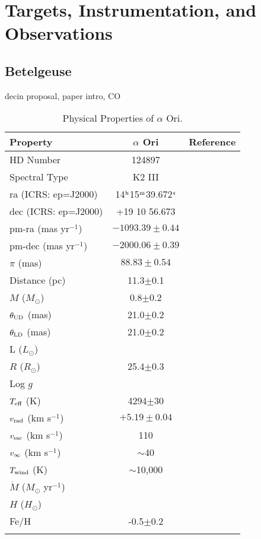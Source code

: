 
\chapter{Targets, Instrumentation, and Observations} \label{chap:3}

\section{Betelgeuse}\label{sec:3.1}
decin proposal, paper intro, CO

\begin{table}
\begin{center}
\caption[Physical Properties of $\alpha$ Ori.]
{Physical Properties of $\alpha$ Ori.}
\begin{tabular}{lcc}
\hline
\hline
\rule{0pt}{2.5ex}Property & $\alpha$ Ori & Reference \\
\hline
\rule{0pt}{2.5ex}HD Number & 124897 & \\
Spectral Type & K2 III &\\ 
ra (ICRS: ep=J2000)&14$^{\rm{h}}$15$^{\rm{m}}$39.672$^{\rm{s}}$&\\
dec (ICRS: ep=J2000) & +19 10 56.673 & \\
pm-ra (mas yr$^{-1}$)& $-1093.39 \pm 0.44$ & \\
pm-dec (mas yr$^{-1}$)& $-2000.06 \pm 0.39$ & \\
$\pi$ (mas)& $88.83\pm 0.54$ &\\
Distance (pc)& 11.3$\pm$0.1 & \\
$M$ ($M_{\odot}$) & 0.8$\pm$0.2 & \\
$\theta _{\rm{UD}}$ (mas)& 21.0$\pm$0.2 & \\
$\theta _{\rm{LD}}$ (mas)& 21.0$\pm$0.2 & \\
L ($L_{\odot}$)& &  \\
$R$ ($R_{\odot}$)& 25.4$\pm$0.3 & \\
Log $g$ & &  \\
$T_{\rm{eff}}$ (K) & 4294$\pm$30 & \\
$v_{\rm{rad}}$ (km s$^{-1}$) & $+5.19 \pm 0.04$ & \\
$v_{\rm{esc}}$ (km s$^{-1}$) &110 & \\
$v_{\rm{\infty}}$ (km s$^{-1}$)& $\sim$40 & \\
$T_{\rm{wind}}$ (K)& $\sim$10,000 & \\
$\dot{M}$ ($M_{\odot}$ yr$^{-1}$)& \\
$H$ ($H_{\odot}$)& & \\
 Fe/H& -0.5$\pm$0.2 &\\
\hline
\rule{0pt}{2.5ex}
\end{tabular}
\label{tab:3.1}
\end{center}
\end{table}

